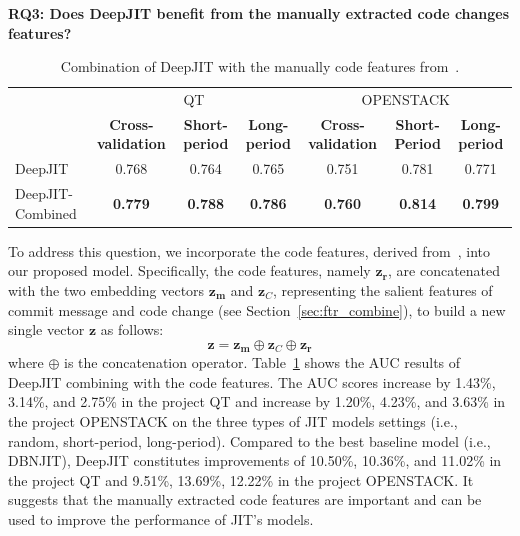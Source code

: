 \noindent \textbf{RQ3: Does DeepJIT benefit from the manually extracted code changes features?}

\begin{table}[t!]
  \centering
  \caption{Combination of DeepJIT with the manually code features from~\cite{mcintosh2018fix}.}
    \begin{tabular}{|l|c|c|c|c|c|c|}
    \hline
    \multirow{2}[4]{*}{} & \multicolumn{3}{c|}{QT} & \multicolumn{3}{c|}{OPENSTACK} \\
\cline{2-7}          & \textbf{Cross-validation} & \textbf{Short-period} & \textbf{Long-period} & \textbf{Cross-validation} & \textbf{Short-Period} & \textbf{Long-period} \\
    \hline
    \hline
    DeepJIT & 0.768 & 0.764 & 0.765 & 0.751 & 0.781 & 0.771  \\
    \hline
    DeepJIT-Combined & \textbf{0.779} & \textbf{0.788} & \textbf{0.786}  & \textbf{0.760} & \textbf{0.814} & \textbf{0.799} \\
    \hline
    \end{tabular}%
  \label{tab:combined}%
\end{table}%

To address this question, we incorporate the code features, derived from~\cite{mcintosh2018fix}, into our proposed model. Specifically, the code features, namely $\textbf{z}_\textbf{r}$, are concatenated with the two embedding vectors  $\textbf{z}_\textbf{m}$ and $\textbf{z}_C$, representing the salient features of commit message and code change (see Section~\ref{sec:ftr_combine}), to build a new single vector $\textbf{z}$ as follows:
\begin{equation}
\label{eq:combined_ftr}
\textbf{z} = \textbf{z}_\textbf{m} \oplus \textbf{z}_C \oplus \textbf{z}_\textbf{r}
\end{equation}
where $\oplus$ is the concatenation operator. Table~\ref{tab:combined} shows the AUC results of DeepJIT combining with the code features. The AUC scores increase by 1.43\%, 3.14\%, and 2.75\% in the project QT and increase by 1.20\%, 4.23\%, and 3.63\% in the project OPENSTACK on the three types of JIT models settings (i.e., random, short-period, long-period). Compared to the best baseline model (i.e., DBNJIT), DeepJIT constitutes improvements of 10.50\%, 10.36\%, and 11.02\% in the project QT and 9.51\%, 13.69\%, 12.22\% in the project OPENSTACK. It suggests that the manually extracted code features are important and can be used to improve the performance of JIT's models.

